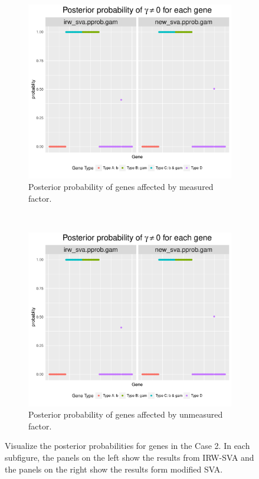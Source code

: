 \documentclass[11pt]{article}
\begin{document}
\begin{figure}[h!]
    \centering
    \begin{subfigure}[t]{0.4\textwidth}
    \centering
    \includegraphics[width = \textwidth]{figures/pprop2_1.pdf}
    \caption{Posterior probability of genes affected by measured factor.}
    \label{fig:pprob1_1}
    \end{subfigure}
~    
    \begin{subfigure}[t]{0.4\textwidth}
    \centering
    \includegraphics[width = \textwidth]{figures/pprop2_1.pdf}
    \caption{Posterior probability of genes affected by unmeasured factor.}
    \label{fig:pprob1_2}
    \end{subfigure}
    \caption{Visualize the posterior probabilities for genes in the Case 2. In each subfigure, the panels on the left show the results from IRW-SVA and the panels on the right show the results form modified SVA.}
    \label{fig:visual1}
\end{figure}
\end{document}
